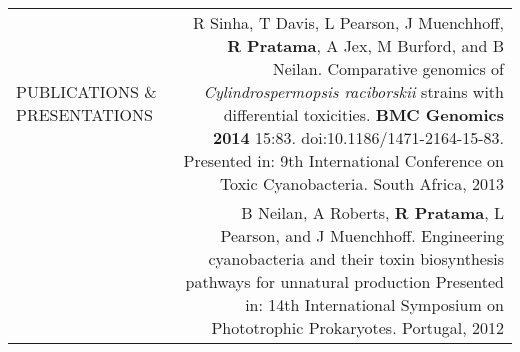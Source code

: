 \documentclass[a4paper,10pt]{article}
\newcommand\VRule{\color{lightgray}\vrule}
\newcommand\HRule{}
\begin{document}
\vspace{0.15in}
\begin{tabular}{L!{\VRule}R}
\uppercase{Publications \& Presentations \HRule}

 &  R Sinha, T Davis, L Pearson, J Muenchhoff, \textbf{R Pratama}, A Jex, M Burford, and B Neilan.
Comparative genomics of \textit{Cylindrospermopsis raciborskii} strains with differential toxicities. \textbf{BMC Genomics 2014} 15:83. doi:10.1186/1471-2164-15-83. Presented in: 9th International Conference on Toxic Cyanobacteria. South Africa, 2013

\\
 &  B Neilan, A Roberts, \textbf{R Pratama}, L Pearson, and J Muenchhoff.
Engineering cyanobacteria and their toxin biosynthesis  pathways for unnatural production
Presented in: 14th International Symposium on Phototrophic Prokaryotes. Portugal, 2012
\\

\end{tabular}
\end{document}
